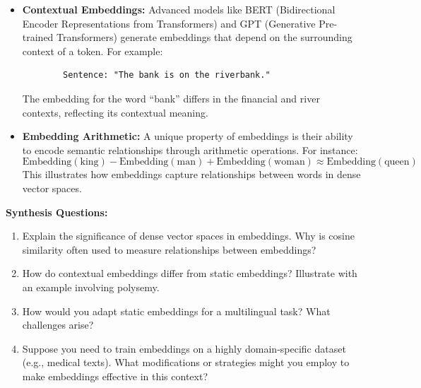 \begin{flushleft}
\begin{itemize}
        \item \textbf{Contextual Embeddings:} 
        Advanced models like BERT (Bidirectional Encoder Representations from Transformers) and GPT (Generative Pre-trained Transformers) generate embeddings that depend on the surrounding context of a token. For example:
        \begin{verbatim}
        Sentence: "The bank is on the riverbank."
        \end{verbatim}
        The embedding for the word ``bank'' differs in the financial and river contexts, reflecting its contextual meaning.

        \item \textbf{Embedding Arithmetic:}
        A unique property of embeddings is their ability to encode semantic relationships through arithmetic operations. For instance:
        \[
        \text{Embedding}(\text{king}) - \text{Embedding}(\text{man}) + \text{Embedding}(\text{woman}) \approx \text{Embedding}(\text{queen})
        \]
        This illustrates how embeddings capture relationships between words in dense vector spaces.
    \end{itemize}
\end{flushleft}



\begin{questionbox}
\textbf{Synthesis Questions:}
\begin{enumerate}
    \item Explain the significance of dense vector spaces in embeddings. Why is cosine similarity often used to measure relationships between embeddings?
    \item How do contextual embeddings differ from static embeddings? Illustrate with an example involving polysemy.
    \item How would you adapt static embeddings for a multilingual task? What challenges arise?
    \item Suppose you need to train embeddings on a highly domain-specific dataset (e.g., medical texts). What modifications or strategies might you employ to make embeddings effective in this context?
\end{enumerate}
\end{questionbox}


